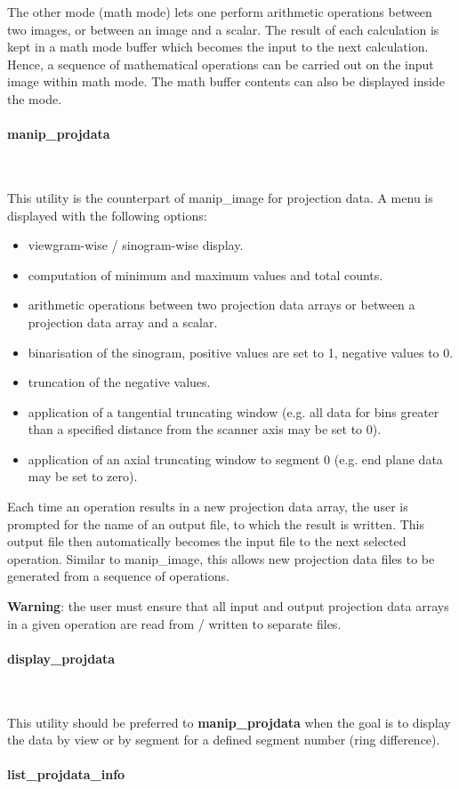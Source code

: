 \documentclass{article}
\newcommand{\subsubsubsection}[1]{\paragraph{#1}\mbox{} \\}
\begin{document}
The other mode (math mode) lets one perform arithmetic operations 
between two images, or between an image and a scalar. The result 
of each calculation is kept in a math mode buffer which becomes 
the input to the next calculation. Hence, a sequence of mathematical 
operations can be carried out on the input image within math 
mode. The math buffer contents can also be displayed inside the 
mode.

{ \subsubsubsection{manip\_projdata}
}

This utility is the counterpart of manip\_image for projection 
data. A menu is displayed with the following options:

\begin{itemize}
\item viewgram-wise / sinogram-wise display.
\item computation of minimum and maximum values and total counts.
\item arithmetic operations between two projection data arrays or 
between a projection data array and a scalar.
\item binarisation of the sinogram, positive values are set to 1, 
negative values to 0.
\item truncation of the negative values.
\item application of a tangential truncating window (e.g. all data 
for bins greater than a specified distance from the scanner axis 
may be set to 0).
\item application of an axial truncating window to segment 0 (e.g. 
end plane data may be set to zero).
\end{itemize}
Each time an operation results in a new projection data array, 
the user is prompted for the name of an output file, to which 
the result is written. This output file then automatically becomes 
the input file to the next selected operation. Similar to manip\_image, 
this allows new projection data files to be generated from a 
sequence of operations.


\textbf{Warning}: the user must ensure that all input and output projection 
data arrays in a given operation are read from / written to separate 
files.

{ \subsubsubsection{display\_projdata}
}

This utility should be preferred to \textbf{manip\_projdata} when the 
goal is to display the data by view or by segment for a defined 
segment number (ring difference).

{ \subsubsubsection{list\_projdata\_info}
}
\end{document}
